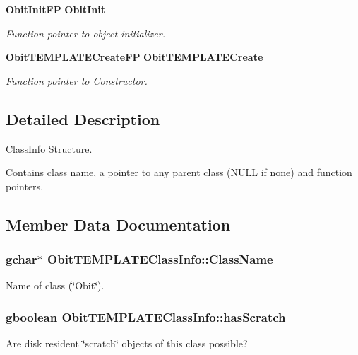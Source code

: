 \begin{CompactItemize}
{\bf Obit\-Init\-FP} {\bf Obit\-Init}
\begin{CompactList}\small\item\em Function pointer to object initializer. \item\end{CompactList}\item 
{\bf Obit\-TEMPLATECreate\-FP} {\bf Obit\-TEMPLATECreate}
\begin{CompactList}\small\item\em Function pointer to Constructor. \item\end{CompactList}\end{CompactItemize}


\subsection{Detailed Description}
Class\-Info Structure. 

Contains class name, a pointer to any parent class (NULL if none) and function pointers. 



\subsection{Member Data Documentation}
\subsubsection{\setlength{\rightskip}{0pt plus 5cm}gchar$\ast$ {\bf Obit\-TEMPLATEClass\-Info::Class\-Name}}\label{structObitTEMPLATEClassInfo_o2}


Name of class (\char`\"{}Obit\char`\"{}). 

\subsubsection{\setlength{\rightskip}{0pt plus 5cm}gboolean {\bf Obit\-TEMPLATEClass\-Info::has\-Scratch}}\label{structObitTEMPLATEClassInfo_o1}


Are disk resident \char`\"{}scratch\char`\"{} objects of this class possible? 

